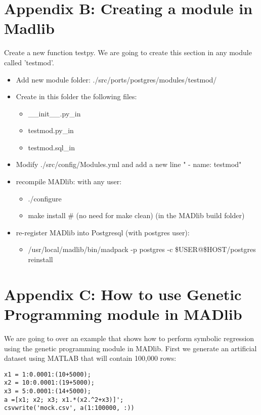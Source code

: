 \section*{Appendix B: Creating a module in Madlib}

Create a new function testpy. We are going to create this section in any module called 'testmod'.

\begin{itemize}
  \item Add new module folder: ./src/ports/postgres/modules/testmod/
  \item Create in this folder the following files:

\begin{itemize}
  \item \_\_init\_\_.py\_in  
  \item testmod.py\_in
  \item testmod.sql\_in
\end{itemize}

\item Modify ./src/config/Modules.yml and add a new line "	- name: testmod"
  \item recompile MADlib: with any user:

\begin{itemize}
  \item ./configure
  \item make install      \# (no need for make clean) (in the MADlib build folder)
\end{itemize}
  \item re-register MADlib into Postgresql (with postgres user):
  \begin{itemize}
  \item  /usr/local/madlib/bin/madpack -p postgres -c \$USER@\$HOST/postgres reinstall
  \end{itemize}
 \end{itemize}
 


\section*{Appendix C: How to use Genetic Programming module in MADlib}

We are going to over an example that shows how to perform symbolic regression using the genetic programming module in MADlib. First we generate an artificial dataset using MATLAB that will contain 100,000 rows:

\begin{verbatim}
x1 = 1:0.0001:(10+5000);
x2 = 10:0.0001:(19+5000);
x3 = 5:0.0001:(14+5000);
a =[x1; x2; x3; x1.*(x2.^2+x3)]';
csvwrite('mock.csv', a(1:100000, :))
\end{verbatim}

